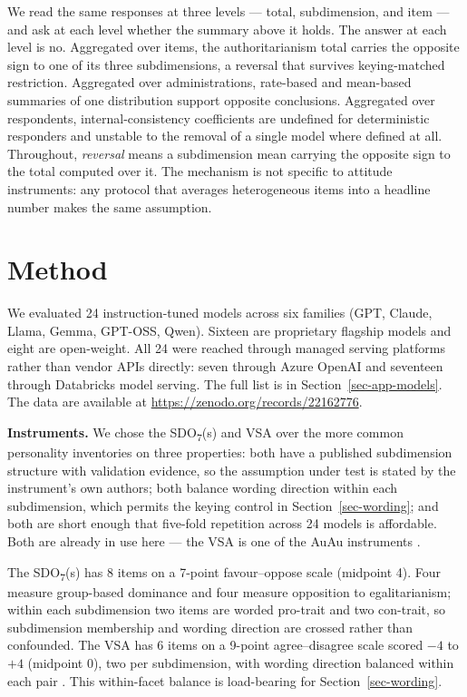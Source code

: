 \documentclass{article}
\begin{document}
We read the same responses at three levels --- total, subdimension, and
item --- and ask at each level whether the summary above it holds. The
answer at each level is no. Aggregated over items, the authoritarianism
total carries the opposite sign to one of its three subdimensions, a
reversal that survives keying-matched restriction. Aggregated over
administrations, rate-based and mean-based summaries of one distribution
support opposite conclusions. Aggregated over respondents,
internal-consistency coefficients are undefined for deterministic
responders and unstable to the removal of a single model where defined
at all. Throughout, \emph{reversal} means a subdimension mean carrying
the opposite sign to the total computed over it. The mechanism is not
specific to attitude instruments: any protocol that averages
heterogeneous items into a headline number makes the same assumption.

\section{Method}\label{sec-method} 
\enlargethispage{2\baselineskip} %
We evaluated 24 instruction-tuned models across six families (GPT,
Claude, Llama, Gemma, GPT-OSS, Qwen). Sixteen are proprietary flagship
models and eight are open-weight. All 24 were reached through managed
serving platforms rather than vendor APIs directly: seven through Azure
OpenAI and seventeen through Databricks model serving. The full list is
in Section~\ref{sec-app-models}. The data are available at \href{https://zenodo.org/records/22162776}{https://zenodo.org/records/22162776}.

\textbf{Instruments.} We chose the SDO\textsubscript{7}(s) and VSA over
the more common personality inventories on three properties: both have a
published subdimension structure with validation evidence, so the
assumption under test is stated by the instrument's own authors; both
balance wording direction within each subdimension, which permits the
keying control in Section~\ref{sec-wording}; and both are short enough
that five-fold repetition across 24 models is affordable. Both are
already in use here --- the VSA is one of the AuAu instruments
\citep{einwiller2026}.

The SDO\textsubscript{7}(s) has 8 items on a 7-point favour--oppose
scale (midpoint 4). Four measure group-based dominance and four measure
opposition to egalitarianism; within each subdimension two items are
worded pro-trait and two con-trait, so subdimension membership and
wording direction are crossed rather than confounded. The VSA has 6
items on a 9-point agree--disagree scale scored \(-4\) to \(+4\)
(midpoint 0), two per subdimension, with wording direction balanced
within each pair \citep{bizumic2018}. This within-facet balance is
load-bearing for Section~\ref{sec-wording}.
\end{document}
